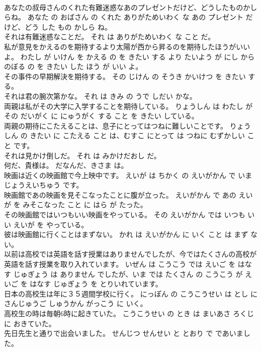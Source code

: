 \documentclass[8pt]{extreport}
\begin{document}
\begin{CJK}{UTF8}{min}
\\	あなたの叔母さんのくれた有難迷惑なあのプレゼントだけど、どうしたものかしらね。	あなた の おばさん の くれた ありがためいわく な あの プレゼント だ けど、どう した もの かしら ね。	
\\	それは有難迷惑なことだ。	それ は ありがためいわく な こと だ。	
\\	私が意見をかえるのを期待するより太陽が西から昇るのを期待したほうがいいよ。	わたし が いけん を かえる の を きたい する より たいよう が にし から のぼる の を きたい した ほう が いい よ。	
\\	その事件の早期解決を期待する。	その じけん の そうき かいけつ を きたい する。	
\\	それは君の腕次第かな。	それ は きみ の うで しだい かな。	
\\	両親は私がその大学に入学することを期待している。	りょうしん は わたし が その だいがく に にゅうがく する こと を きたい している。	
\\	両親の期待にこたえることは、息子にとってはつねに難しいことです。	りょうしん の きたい に こたえる こと は、むすこ にとって は つねに むずかしい こと です。	
\\	それは見かけ倒しだ。	それ は みかけだおし だ。	
\\	何だ、貴様は。	だなんだ、きさま は。	
\\	映画は近くの映画館で今上映中です。	えいが は ちかく の えいがかん で いま じょうえいちゅう です。	
\\	映画館であの映画を見そこなったことに腹が立った。	えいがかん で あの えいが を みそこなった こと に はら が たった。	
\\	その映画館ではいつもいい映画をやっている。	その えいがかん では いつも いい えいが を やっている。	
\\	彼は映画館に行くことはまずない。	かれ は えいがかん に いく こと は まず ない。	
\\	以前は高校では英語を話す授業はありませんでしたが、今ではたくさんの高校が英語を話す授業を取り入れています。	いぜん は こうこう では えいご を はなす じゅぎょう は ありません でしたが、いま では たくさん の こうこう が えいご を はなす じゅぎょう を とりいれています。	
\\	日本の高校生は年に３５週間学校に行く。	にっぽん の こうこうせい は とし に さんじゅうご しゅうかん がっこう に いく。	
\\	高校生の時は毎朝6時に起きていた。	こうこうせい の とき は まいあさ ろくじ に おきていた。	
\\	先日先生と通りで出会いました。	せんじつ せんせい と とおり で であいました。	

\end{CJK}
\end{document}
